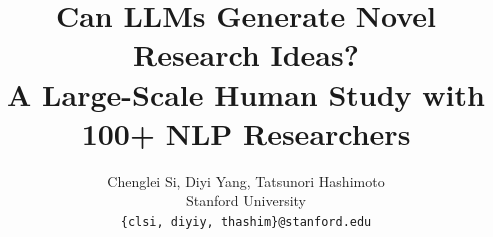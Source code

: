 \documentclass{article}
\begin{document}



\title{Can LLMs Generate Novel Research Ideas? \\
\vspace{8pt} \Large A Large-Scale Human Study with 100+ NLP Researchers}

\author{%
        \large{Chenglei Si, Diyi Yang, Tatsunori Hashimoto} \\
        \large{Stanford University}\\
        {\texttt{\{clsi, diyiy, thashim\}@stanford.edu}}
}


\date{}

\newcommand{\fix}{\marginpar{FIX}}
\newcommand{\new}{\marginpar{NEW}}
\newcommand{\gcheckmark}{\textcolor{green}{\checkmark}} %
\newcommand{\rxmark}{\textcolor{red}{\ding{55}}} %

\maketitle
















\newpage
\appendix

\end{document}
